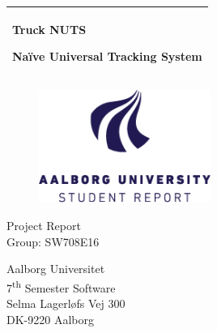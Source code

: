 %
\newcommand{\titlefont}{\sffamily\fontsize{36pt}{0pt}\selectfont}
\newcommand{\subtitlefont}{\sffamily\fontsize{26pt}{0pt}\selectfont}
\newcommand{\otherfont}{\sffamily\fontsize{18pt}{0pt}\selectfont}
\newcommand{\smallfont}{\sffamily\fontsize{12pt}{0pt}\selectfont}
\begin{titlepage}
    \addtolength{\hoffset}{0.5\evensidemargin-0.5\oddsidemargin} %
    \noindent%
    \begin{tabular}{@{}p{\textwidth}@{}}
        \toprule[2pt]
        \midrule
        \vspace{0.2cm}
        \begin{center}
        \titlefont Truck NUTS
        \end{center}
    \vspace{0.1cm}
        \begin{center}
        \subtitlefont Naïve Universal Tracking System
    \end{center}
        \vspace{0.2cm}\\
        \midrule
        \toprule[2pt]
    \end{tabular}
    \vspace{2 cm}
    \begin{figure}[h!]
        \centering
        \includegraphics[width=0.5\textwidth]{img/aau-logo-english.png}
    \end{figure}
    \vspace{3 cm}
    \begin{center}
        \otherfont
            Project Report
        \\
        \vspace{0.2cm}
        \otherfont
            Group: SW708E16
    \end{center}
    \vfill
    \begin{center}
    \smallfont
    Aalborg Universitet\\
    7\textsuperscript{th} Semester Software\\ \vspace{0.1cm}
    Selma Lagerløfs Vej 300\\
    DK-9220 Aalborg
    \end{center}
\end{titlepage}
\clearpage
\cleardoublepage
